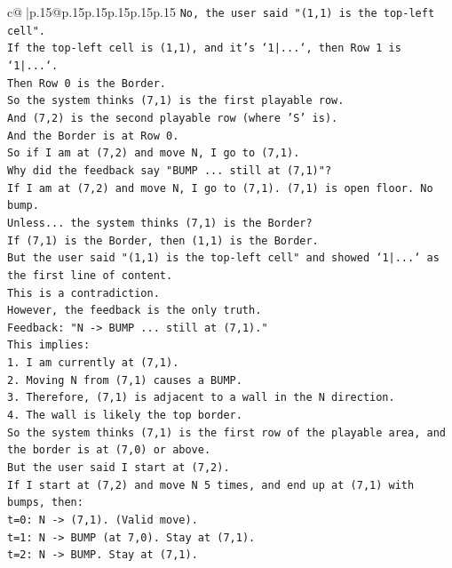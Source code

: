 \documentclass{article}
\begin{document}
{\begin{supertabular}{c@{$\;$}|p{.15\linewidth}@{}p{.15\linewidth}p{.15\linewidth}p{.15\linewidth}p{.15\linewidth}p{.15\linewidth}}
{{{\texttt{No, the user said "(1,1) is the top{-}left cell".} \\
\texttt{If the top{-}left cell is (1,1), and it's `1|...`, then Row 1 is `1|...`.} \\
\texttt{Then Row 0 is the Border.} \\
\texttt{So the system thinks (7,1) is the first playable row.} \\
\texttt{And (7,2) is the second playable row (where 'S' is).} \\
\texttt{And the Border is at Row 0.} \\
\texttt{So if I am at (7,2) and move N, I go to (7,1).} \\
\texttt{Why did the feedback say "BUMP ... still at (7,1)"?} \\
\texttt{If I am at (7,2) and move N, I go to (7,1). (7,1) is open floor. No bump.} \\
\texttt{Unless... the system thinks (7,1) is the Border?} \\
\texttt{If (7,1) is the Border, then (1,1) is the Border.} \\
\texttt{But the user said "(1,1) is the top{-}left cell" and showed `1|...` as the first line of content.} \\
\texttt{This is a contradiction.} \\
\texttt{However, the feedback is the only truth.} \\
\texttt{Feedback: "N {-}> BUMP ... still at (7,1)."} \\
\texttt{This implies:} \\
\texttt{1. I am currently at (7,1).} \\
\texttt{2. Moving N from (7,1) causes a BUMP.} \\
\texttt{3. Therefore, (7,1) is adjacent to a wall in the N direction.} \\
\texttt{4. The wall is likely the top border.} \\
\texttt{So the system thinks (7,1) is the first row of the playable area, and the border is at (7,0) or above.} \\
\texttt{But the user said I start at (7,2).} \\
\texttt{If I start at (7,2) and move N 5 times, and end up at (7,1) with bumps, then:} \\
\texttt{t=0: N {-}> (7,1). (Valid move).} \\
\texttt{t=1: N {-}> BUMP (at 7,0). Stay at (7,1).} \\
\texttt{t=2: N {-}> BUMP. Stay at (7,1).} \\
}}}
\end{supertabular}}
\end{document}
